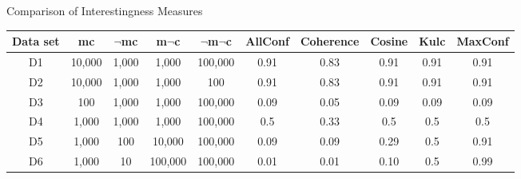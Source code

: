 \begin{frame}{Comparison of Interestingness Measures}
{\begin{tabular}{|c|c|c|c|c||c|c|c|c|c|}
			\hline
			Data set & mc & $\neg$mc & m$\neg$c & $\neg$m$\neg$c & 
			AllConf & Coherence & Cosine & Kulc & MaxConf \\\hline
			\color{red}D1 & \color{red}10,000 & \color{red}1,000 & 
			\color{red}1,000 & \color{red}100,000 & \color{red}0.91 & 
			\color{red}0.83 & \color{red}0.91 & \color{red}0.91 & 
			\color{red}0.91 \\\hline
			\color{red}D2 & \color{red}10,000 & \color{red}1,000 & 
			\color{red}1,000 & \color{red}100 & \color{red}0.91 & 
			\color{red}0.83 & \color{red}0.91 & \color{red}0.91 & 
			\color{red}0.91 \\\hline
			D3 & 100 & 1,000 & 1,000 & 100,000 & 0.09 & 0.05 & 0.09 &   
			0.09 & 0.09 \\\hline
			\color{blue} D4 & \color{blue}1,000 & \color{blue}1,000 & 
			\color{blue}1,000 & \color{blue}100,000 & \color{blue}0.5 & 
			\color{blue}0.33 & \color{blue}0.5 & \color{blue}0.5 & 
			\color{blue}0.5 \\\hline
			\color{blue}D5 & \color{blue}1,000 & \color{blue}100 & 
			\color{blue}10,000 & \color{blue}100,000 & \color{blue}0.09 
			& \color{blue}0.09 & \color{blue}0.29 & \color{blue}0.5 & 
			\color{blue}0.91 \\\hline
			\color{blue}D6 & \color{blue}1,000 & \color{blue}10 & 
			\color{blue}100,000 & \color{blue}100,000 & 
			\color{blue}0.01 & \color{blue}0.01 & \color{blue}0.10 & 
			\color{blue}0.5 & \color{blue}0.99 \\\hline
	\end{tabular}}
\end{frame}

